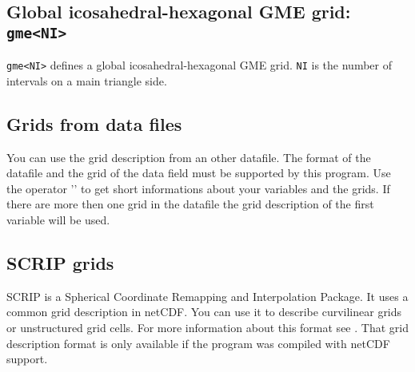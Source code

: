 
\subsection*{Global icosahedral-hexagonal GME grid: {\tt gme<NI>}}
    {\tt gme<NI>} defines a global icosahedral-hexagonal GME grid.
    {\tt NI} is the number of intervals on a main triangle side.

\subsection{Grids from data files}

You can use the grid description from an other datafile.
The format of the datafile and the grid of the data field must
be supported by this program.
Use the operator '' to get short informations about
your variables and the grids.
If there are more then one grid in the datafile the grid description of
the first variable will be used.

\subsection{SCRIP grids}

SCRIP is a Spherical Coordinate Remapping and Interpolation Package.
It uses a common grid description in netCDF.
You can use it to describe curvilinear grids or unstructured grid cells.
For more information about this format see \cite{SCRIP}.
That grid description format is only available if the program was compiled
with netCDF support.

\vspace{2mm}

